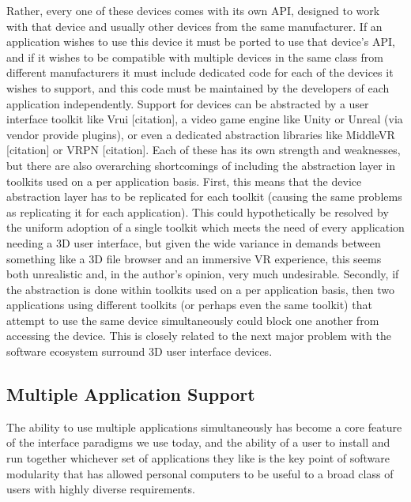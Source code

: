 Rather, every one of these devices comes with its own API, designed to work with that device and usually other devices from the same manufacturer. If an application wishes to use this device it must be ported to use that device’s API, and if it wishes to be compatible with multiple devices in the same class from different manufacturers it must include dedicated code for each of the devices it wishes to support, and this code must be maintained by the developers of each application independently. Support for devices can be abstracted by a user interface toolkit like Vrui [citation], a video game engine like Unity or Unreal (via vendor provide plugins), or even a dedicated abstraction libraries like MiddleVR [citation] or VRPN [citation]. Each of these has its own strength and weaknesses, but there are also overarching shortcomings of including the abstraction layer in toolkits used on a per application basis. First, this means that the device abstraction layer has to be replicated for each toolkit (causing the same problems as replicating it for each application). This could hypothetically be resolved by the uniform adoption of a single toolkit which meets the need of every application needing a 3D user interface, but given the wide variance in demands between something like a 3D file browser and an immersive VR experience, this seems both unrealistic and, in the author’s opinion, very much undesirable. Secondly, if the abstraction is done within toolkits used on a per application basis, then two applications using different toolkits (or perhaps even the same toolkit) that attempt to use the same device simultaneously could block one another from accessing the device. This is closely related to the next major problem with the software ecosystem surround 3D user interface devices.

\subsection{Multiple Application Support}

The ability to use multiple applications simultaneously has become a core feature of the interface paradigms we use today, and the ability of a user to install and run together whichever set of applications they like is the key point of software modularity that has allowed personal computers to be useful to a broad class of users with highly diverse requirements.
 
